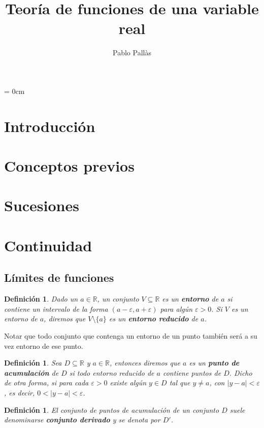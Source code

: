 \documentclass[12pt]{article}
\author{Pablo Pallàs}
\title{Teoría de funciones de una variable real}
\newtheorem{definition}[theorem]{Definición}
\begin{document}
\rmfamily
\maketitle
\tableofcontents
\parindent= 0cm


\section{Introducción}
\section{Conceptos previos}
\section{Sucesiones}
\section{Continuidad}
\subsection{Límites de funciones}

\begin{definition}Dado un $a \in \mathbb{R}$, un conjunto $V \subseteq \mathbb{R}$ es un \textbf{entorno} de $a$ si contiene un intervalo de la forma $(a - \varepsilon, a + \varepsilon)$ para algún $\varepsilon >0$. Si $V$ es un entorno de $a$, diremos que $V \setminus \lbrace a \rbrace$ es un \textbf{entorno reducido} de $a$.
\end{definition}

Notar que todo conjunto que contenga un entorno de un punto también será a su vez entorno de ese punto.

\begin{definition}Sea $D \subseteq \mathbb{R}$ y $a \in \mathbb{R}$, entonces diremos que $a$ es un \textbf{punto de acumulación} de $D$ si todo entorno reducido de $a$ contiene puntos de $D$. Dicho de otra forma, si para cada $\varepsilon >0$ existe algún $y \in D$ tal que $y \neq a$, con $|y-a| < \varepsilon$, es decir, $0 < |y-a| < \varepsilon$.
\end{definition}

\begin{definition}El conjunto de puntos de acumulación de un conjunto $D$ suele denominarse \textbf{conjunto derivado} y se denota por $D'$.
\end{definition}
\end{document}
